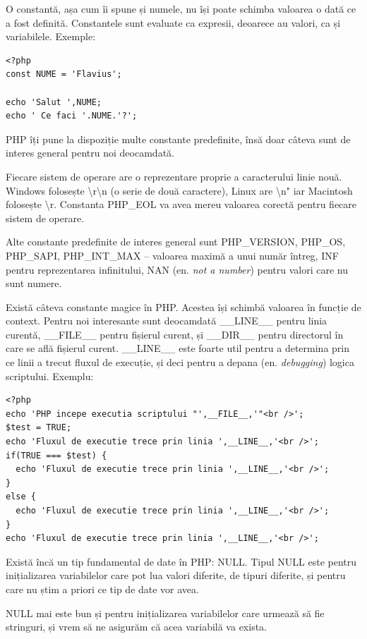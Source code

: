 O constantă, așa cum îi spune și numele, nu își poate schimba valoarea o dată
ce a fost definită. Constantele sunt evaluate ca expresii, deoarece au valori,
ca și variabilele. Exemple:
\begin{lstlisting}
<?php
const NUME = 'Flavius';

echo 'Salut ',NUME;
echo ' Ce faci '.NUME.'?';
\end{lstlisting}

PHP îți pune la dispoziție multe constante predefinite, însă doar
câteva sunt de interes general
pentru noi deocamdată.

Fiecare sistem de operare  are o reprezentare proprie
a caracterului {\glqq}linie nouă{\grqq}. Windows folosește {\glqq}{\textbackslash}r{\textbackslash}n{\grqq} (o
serie de două caractere{\glqq}), Linux are {\grqq}{\textbackslash}n" iar Macintosh folosește
{\glqq}{\textbackslash}r{\grqq}. Constanta PHP\_EOL va avea mereu valoarea corectă pentru
fiecare sistem de operare.

Alte constante predefinite de interes general sunt PHP\_VERSION, PHP\_OS,
PHP\_SAPI, PHP\_INT\_MAX -- valoarea maximă a unui număr întreg, INF pentru
reprezentarea infinitului, NAN (en. \textsl{not a number}) pentru valori
care nu sunt numere.

Există câteva constante magice în PHP. Acestea își schimbă valoarea
în funcție de context. Pentru noi interesante sunt deocamdată
\_\_LINE\_\_ pentru linia curentă, \_\_FILE\_\_ pentru fișierul
curent, și \_\_DIR\_\_ pentru directorul în care se află fișierul curent.
\_\_LINE\_\_ este foarte util pentru a determina prin ce linii 
a trecut fluxul de execuție, și deci pentru a depana (en. \textsl{debugging})
logica scriptului. Exemplu:
\begin{lstlisting}
<?php
echo 'PHP incepe executia scriptului "',__FILE__,'"<br />';
$test = TRUE;
echo 'Fluxul de executie trece prin linia ',__LINE__,'<br />';
if(TRUE === $test) {
  echo 'Fluxul de executie trece prin linia ',__LINE__,'<br />';
}
else {
  echo 'Fluxul de executie trece prin linia ',__LINE__,'<br />';
}
echo 'Fluxul de executie trece prin linia ',__LINE__,'<br />';
\end{lstlisting}

Există încă un tip fundamental de date în PHP: NULL. Tipul NULL
este pentru inițializarea variabilelor care pot lua valori diferite, de tipuri
diferite, și pentru care nu știm a priori ce tip de date vor avea.

NULL mai este bun și pentru inițializarea variabilelor care urmează să fie
stringuri, și vrem să ne asigurăm că acea variabilă va exista.

